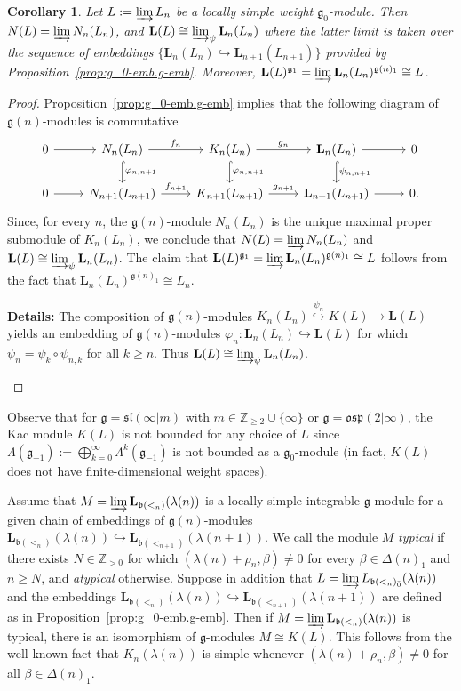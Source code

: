 \documentclass[12pt]{amsart}
\newcommand\Z{\mathbb{Z}}
\newcommand\g{\mathfrak{g}}
\newcommand\fb{\mathfrak{b}}
\newcommand\fsl{\mathfrak{sl}}
\newcommand\fosp{\mathfrak{osp}}
\newcommand\D{\Delta}
\newcommand\bL{\mathbf{L}}
\theoremstyle{plain}
\newtheorem{cor}[theo]{Corollary}
\theoremstyle{definition}
\numberwithin{equation}{section}
\newcommand{\details}[1]{\smallskip \color{blue} \begin{footnotesize} \textbf{Details:} #1 \end{footnotesize} \color{black}}
\newcommand{\details}[1]{}
\begin{document}
\begin{cor}\label{prop:Kac.mod.structure}
Let $L := \varinjlim L_n$ be a locally simple weight $\g_0$-module. Then  $N(L) = \varinjlim N_n(L_n)$, and $\bL(L)\cong \varinjlim_\psi \bL_n(L_n)$ where the latter limit is taken over the sequence of embeddings $\{\bL_n(L_n)\hookrightarrow \bL_{n+1}(L_{n+1})\}$ provided by Proposition~\ref{prop:g_0-emb.g-emb}. Moreover, $\bL(L)^{\g_1} = \varinjlim \bL_n(L_n)^{\g(n)_1} \cong L$.
\end{cor}
\begin{proof}
Proposition~\ref{prop:g_0-emb.g-emb} implies that the following diagram of $\g(n)$-modules is commutative
	\[
\begin{tikzcd}
0 \arrow[r] & N_n(L_n) \arrow[r, "f_n"] \arrow[d, hook, "\varphi_{n,n+1}"]  & K_n(L_n) \arrow[r, "g_n"] \arrow[d, hook, "\varphi_{n,n+1}"] & \bL_n(L_n) \arrow[r] \arrow[d, hook, "\psi_{n,n+1}"] & 0 \\
0 \arrow[r] & N_{n+1}(L_{n+1}) \arrow[r, "f_{n+1}"]  & K_{n+1}(L_{n+1}) \arrow[r, "g_{n+1}"] & \bL_{n+1}(L_{n+1}) \arrow[r] & 0.
\end{tikzcd}
	\]
Since, for every $n$, the $\g(n)$-module $N_n(L_n)$ is the unique maximal proper submodule of $K_n(L_n)$, we conclude that $N(L) = \varinjlim N_n(L_n)$ and $\bL(L)\cong \varinjlim_\psi \bL_n(L_n)$. The claim that $\bL(L)^{\g_1} = \varinjlim \bL_n(L_n)^{\g(n)_1} \cong L$ follows from the fact that $\bL_n(L_n)^{\g(n)_1}\cong L_n$.

 \details{The composition of $\g(n)$-modules $K_n(L_n)  \stackrel{\psi_n}{\hookrightarrow} K(L)\to \bL(L)$ yields an embedding of $\g(n)$-modules $\varphi_n : \bL_n(L_n) \hookrightarrow \bL(L)$ for which $\psi_n = \psi_k\circ \psi_{n,k}$ for all $k\geq n$. Thus $\bL(L)\cong \varinjlim_\psi \bL_n(L_n)$.}
\end{proof}

Observe that for $\g = \fsl(\infty|m)$ with $m\in \Z_{\geq 2}\cup\{\infty\}$ or $\g=\fosp(2|\infty)$, the Kac module $K(L)$ is not bounded for any choice of $L$ since $\Lambda (\g_{-1}):=\bigoplus_{k=0}^\infty \Lambda^k (\g_{-1})$ is not bounded as a $\g_0$-module (in fact, $K(L)$ does not have finite-dimensional weight spaces). 

Assume that $M = \varinjlim \bL_{\fb(<_n)}(\lambda(n))$ is a locally simple integrable $\g$-module for a given chain of embeddings of $\g(n)$-modules $\bL_{\fb(<_n)}(\lambda(n))\hookrightarrow \bL_{\fb(<_{n+1})}(\lambda(n+1))$. We call the module $M$ \emph{typical} if there exists $N\in \Z_{>0}$ for which $(\lambda(n) + \rho_n, \beta) \neq 0$ for every $\beta\in \D(n)_{1}$ and $n\geq N$, and \emph{atypical} otherwise. Suppose in addition that $L = \varinjlim L_{\fb(<_n)_{\bar 0}}(\lambda(n))$ and the embeddings $\bL_{\fb(<_n)}(\lambda(n))\hookrightarrow \bL_{\fb(<_{n+1})}(\lambda(n+1))$ are defined as in Proposition~\ref{prop:g_0-emb.g-emb}. Then if $M = \varinjlim \bL_{\fb(<_n)}(\lambda(n))$ is typical, there is an isomorphism of $\g$-modules $M \cong K(L)$. This follows from the well known fact that $K_n(\lambda(n))$ is simple whenever $(\lambda(n) + \rho_n, \beta) \neq 0$ for all $\beta\in \D(n)_{1}$.
\end{document}

